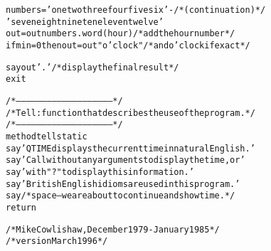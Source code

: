\begin{alltt}
numbers='one two three four five six'-  /* (continuation) */
  'seven eight nine ten eleven twelve '
out=out numbers.word(hour)         /* add the hour number */
if min=0 then out=out "o'clock"   /* and o'clock if exact */

say out'.'                    /* display the final result */
exit

/*--------------------------------------------------------*/
/* Tell: function that describes the use of the program.  */
/*--------------------------------------------------------*/
method tell static
 say 'QTIME displays the current time in natural English.'
 say 'Call without any arguments to display the time, or'
 say 'with "?" to display this information.'
 say 'British English idioms are used in this program.'
 say /* space -- we are about to continue and show time.  */
 return

/* Mike Cowlishaw,  December 1979 - January 1985          */
/* \nr{} version March 1996                             */
\end{alltt}
